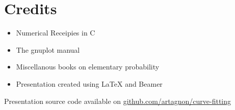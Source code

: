 \section{Credits}
\frame
{
  \begin{itemize}
  \item Numerical Receipies in C
  \item The gnuplot manual
  \item Miscellanous books on elementary probability
  \item Presentation created using \LaTeX{} and Beamer
  \end{itemize}
  \small
  Presentation source code available on \href{http://github.com/artagnon/curve-fitting}{github.com/artagnon/curve-fitting}
}

